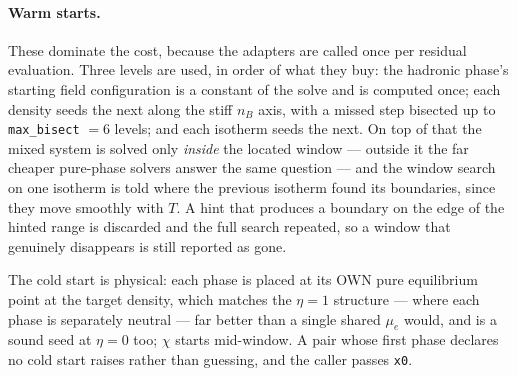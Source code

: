 \documentclass[aps,prc,onecolumn,superscriptaddress,nofootinbib,10pt]{revtex4-2}
\newcommand{\nB}{n_B}
\begin{document}
\paragraph{Warm starts.} These dominate the cost, because the adapters are
called once per residual evaluation. Three levels are used, in order of what
they buy: the hadronic phase's starting field configuration is a constant of
the solve and is computed once; each density seeds the next along the stiff
$\nB$ axis, with a missed step bisected up to \texttt{max\_bisect} $= 6$
levels; and each isotherm seeds the next. On top of that the mixed system
is solved only \emph{inside} the located window --- outside it the far cheaper
pure-phase solvers answer the same question --- and the window search on one
isotherm is told where the previous isotherm found its boundaries, since they
move smoothly with $T$. A hint that produces a boundary on the edge of the
hinted range is discarded and the full search repeated, so a window that
genuinely disappears is still reported as gone.

The cold start is physical: each phase is placed at its OWN pure equilibrium
point at the target density, which matches the $\eta = 1$ structure --- where
each phase is separately neutral --- far better than a single shared $\mu_e$
would, and is a sound seed at $\eta = 0$ too; $\chi$ starts mid-window. A pair
whose first phase declares no cold start raises rather than guessing, and the
caller passes \texttt{x0}.
\end{document}

